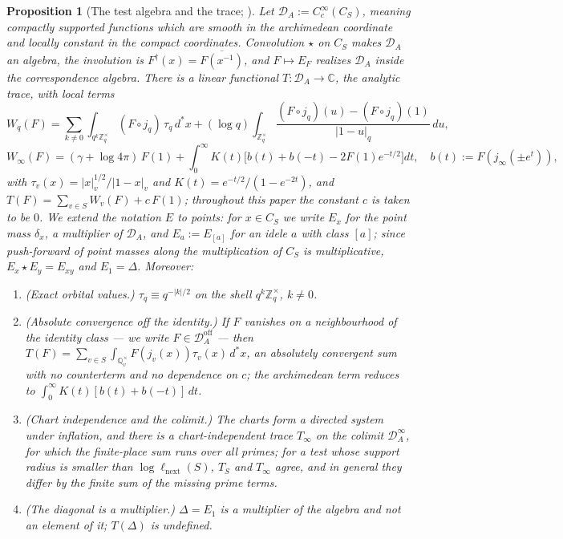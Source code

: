 \documentclass[11pt]{amsart}
\newtheorem{proposition}[theorem]{Proposition}
\theoremstyle{definition}
\theoremstyle{remark}
\newcommand{\C}{\mathbb C}
\newcommand{\Z}{\mathbb Z}
\newcommand{\Q}{\mathbb Q}
\newcommand{\DA}{\mathcal D_A}
\newcommand{\Doff}{\mathcal D_A^{\mathrm{off}}}
\begin{document}
\begin{proposition}[The test algebra and the trace;
{\cite[\S\S6, 11]{Companion}}]\label{prop:trace}
Let $\DA:=C_c^\infty(C_S)$, meaning compactly supported functions which are
smooth in the archimedean coordinate and locally constant in the compact
coordinates. Convolution $\star$ on $C_S$ makes $\DA$ an algebra, the
involution is $F^\dagger(x)=\overline{F(x^{-1})}$, and $F\mapsto E_F$ realizes
$\DA$ inside the correspondence algebra. There is a linear functional
$T:\DA\to\C$, the analytic trace, with local terms
\begin{equation}\label{eq:localterms}
  W_q(F)=\sum_{k\ne0}\int_{q^k\Z_q^\times}(F\circ j_q)\,\tau_q\,d^*x
   +(\log q)\int_{\Z_q^\times}\frac{(F\circ j_q)(u)-(F\circ j_q)(1)}{|1-u|_q}
     \,du,
\end{equation}
\begin{equation}\label{eq:archterm}
  W_\infty(F)=(\gamma+\log4\pi)\,F(1)
   +\int_0^\infty K(t)\bigl[b(t)+b(-t)-2F(1)e^{-t/2}\bigr]dt,\quad
   b(t):=F(j_\infty(\pm e^{t})),
\end{equation}
with $\tau_v(x)=|x|_v^{1/2}/|1-x|_v$ and
$K(t)=e^{-t/2}/(1-e^{-2t})$, and $T(F)=\sum_{v\in S}W_v(F)+c\,F(1)$; throughout
this paper the constant $c$ is taken to be $0$. We extend the notation $E$ to
points: for $x\in C_S$ we write $E_x$ for the point mass $\delta_x$, a
multiplier of $\DA$, and $E_a:=E_{[a]}$ for an idele $a$ with class $[a]$;
since push-forward of point masses along the multiplication of $C_S$ is
multiplicative, $E_x\star E_y=E_{xy}$ and $E_1=\Delta$. Moreover:
\begin{enumerate}
\item[(a)] \emph{(Exact orbital values.)} $\tau_q\equiv q^{-|k|/2}$ on the
shell $q^k\Z_q^\times$, $k\ne0$.
\item[(b)] \emph{(Absolute convergence off the identity.)} If $F$ vanishes on
a neighbourhood of the identity class --- we write $F\in\Doff$ --- then
$T(F)=\sum_{v\in S}\int_{\Q_v^\times}F(j_v(x))\tau_v(x)\,d^*x$, an absolutely
convergent sum with no counterterm and no dependence on $c$; the archimedean
term reduces to $\int_0^\infty K(t)[b(t)+b(-t)]\,dt$.
\item[(c)] \emph{(Chart independence and the colimit.)} The charts form a
directed system under inflation, and there is a chart-independent trace
$T_\infty$ on the colimit $\DA^\infty$, for which the finite-place sum runs
over all primes; for a test whose support radius is smaller than
$\log\ell_{\mathrm{next}}(S)$, $T_S$ and $T_\infty$ agree, and in general they
differ by the finite sum of the missing prime terms.
\item[(d)] \emph{(The diagonal is a multiplier.)} $\Delta=E_1$ is a multiplier
of the algebra and not an element of it; $T(\Delta)$ is undefined.
\end{enumerate}
\end{proposition}
\end{document}
